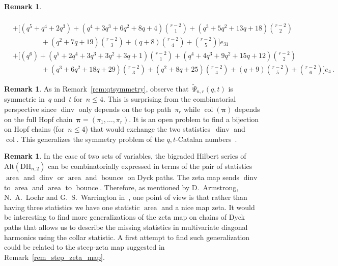 \documentclass{amsart}
\theoremstyle{definition}
\newtheorem{remark}[theorem]{Remark}
\newcommand{\DiagHarm}[2]{\mathrm{DH}_{#1,#2}} %
\newcommand{\area}{\operatorname{area}} %
\newcommand{\dinv}{\operatorname{dinv}} %
\newcommand{\bounce}{\operatorname{bounce}} %
\newcommand{\col}{\operatorname{col}} %
\newcommand{\Alt}{\mathrm{Alt}} %
\newcommand{\bpi}{\boldsymbol \pi} %
\begin{document}
\begin{remark}
\begin{itemize}
\begin{align*}
	\\[4pt]
	& \textstyle  +\big[({\scriptstyle q^{5} + q^{4} + 2q^{3}}) + ({\scriptstyle q^{4} + 3q^{3} + 6q^{2} + 8q + 4}) {r-2 \choose 1} + ({\scriptstyle q^{3} + 5q^{2} + 13q + 18}){r-2 \choose 2} \\
	& \textstyle 	\qquad\qquad + ({\scriptstyle q^{2} + 7q + 19}){r -2\choose 3} + ({\scriptstyle q + 8}){r-2 \choose 4}+{r-2 \choose 5}\big] e_{31}
	\\[4pt]
	& \textstyle + \big[ ({\scriptstyle q^{6}})+ ({\scriptstyle q^{5} + 2q^{4} + 3q^{3} + 3q^{2} + 3q + 1}){r-2 \choose 1} + ({\scriptstyle q^{4} + 4q^{3} + 9q^{2} + 15q + 12}){r -2\choose 2} \\
	& \textstyle 	\qquad\qquad + ({\scriptstyle q^3 + 6q^2 + 18q + 29}){r-2 \choose 3} + ({\scriptstyle q^2 + 8q + 25}){r -2\choose 4}+ ({\scriptstyle  q + 9}){r -2\choose 5}+{r -2\choose 6}\big] e_{4} \,.
\end{align*}
\end{itemize}
\end{remark}

\begin{remark}
As in Remark~\ref{rem:qtsymmetry}, observe that~$\widetilde\Psi_{n,r}(q,t)$ is symmetric in~$q$ and~$t$ for~$n \le 4$.
This is surprising from the combinatorial perspective since $\dinv$ only depends on the top path~$\pi_r$ while $\col(\bpi)$ depends on the full Hopf chain~$\bpi = (\pi_1, \dots, \pi_r)$. It is an open problem to find a bijection on Hopf chains (for~$n \le 4$) that would exchange the two statistics~$\dinv$ and~$\col$. This generalizes the symmetry problem of the $q,t$-Catalan numbers~\cite[Open~Problem~3.11]{Haglund-qt-catalan}.
\end{remark}

\begin{remark}
In the case of two sets of variables, the bigraded Hilbert series of~$\Alt(\DiagHarm{n}{2})$ can be combinatorially expressed in terms of the pair of statistics $\area$ and $\dinv$ or $\area$ and $\bounce$ on Dyck paths. The zeta map sends $\dinv$ to $\area$ and $\area$ to $\bounce$. Therefore, as mentioned by D.~Armstrong, N.~A.~Loehr and G.~S.~Warrington in~\cite{ArmstrongLoehrWarrington-sweep}, one point of view is that rather than having three statistics we have one statistic $\area$ and a nice map zeta. It would be interesting to find more generalizations of the zeta map on chains of Dyck paths that allows us to describe the missing statistics in multivariate diagonal harmonics using the collar statistic. A first attempt to find such generalization could be related to the steep-zeta map suggested in Remark~\ref{rem_step_zeta_map}.
\end{remark}
\end{document}
